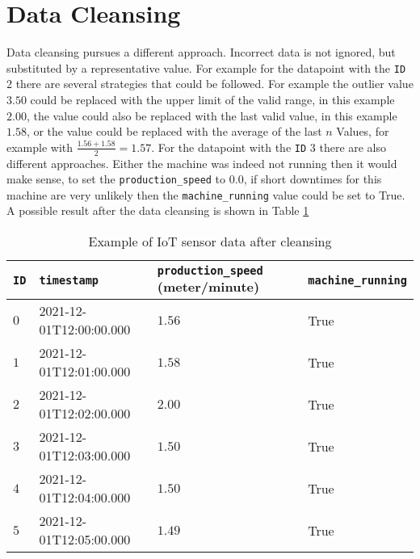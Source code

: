 \section{Data Cleansing}
Data cleansing pursues a different approach. Incorrect data is not ignored, but substituted by a representative value.  For example for the datapoint with the \verb|ID| $2$ there are several strategies that could be followed. For example the outlier value $3.50$ could be replaced with the upper limit of the valid range, in this example $2.00$, the value could also be replaced with the last valid value, in this example $1.58$, or the value could be replaced with the average of the last $n$ Values, for example with $\frac{1.56+1.58}{2} = 1.57$. For the datapoint with the \verb|ID| $3$ there are also different approaches. Either the machine was indeed not running then it would make sense, to set the \verb|production_speed| to $0.0$, if short downtimes for this machine are very unlikely then the \verb|machine_running| value could be set to True. A possible result after the data cleansing is shown in Table \ref{table:example-iot-data-after-cleansing} \cite{maleticDataCleansingIntegrity2000}
\begin{table}[ht]
\begin{tabular}{|l|l|l|l|}
\hline
\verb|ID| & \verb|timestamp|        & \verb|production_speed| (meter/minute) & \verb|machine_running| \\ \hline
$0$       & 2021-12-01T12:00:00.000 & $1.56$                                 & True                   \\ \hline
$1$       & 2021-12-01T12:01:00.000 & $1.58$                                 & True                   \\ \hline
$2$       & 2021-12-01T12:02:00.000 & $2.00$                                 & True                   \\ \hline
$3$       & 2021-12-01T12:03:00.000 & $1.50$                                 & True                   \\ \hline
$4$       & 2021-12-01T12:04:00.000 & $1.50$                                 & True                   \\ \hline
$5$       & 2021-12-01T12:05:00.000 & $1.49$                                 & True                   \\ \hline
\end{tabular}
\caption{Example of IoT sensor data after cleansing}
\label{table:example-iot-data-after-cleansing}
\end{table}